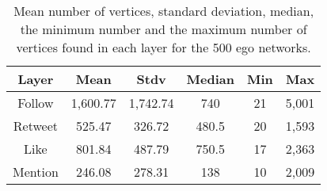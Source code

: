 \begin{table}[h!tb]
    \renewcommand{\arraystretch}{1.3}
    \caption{Mean number of vertices, standard deviation, median, the minimum number and the maximum number of vertices found in each layer for the 500 ego networks.}
    \label{tab:numVertices}
    \centering
    \scriptsize
    \setlength\tabcolsep{6pt} %
    \begin{tabular}{|c|c|c|c|c|c|}
    \hline
        {\bf Layer} &   {\bf Mean}  &   {\bf Stdv}  &   {\bf Median} & {\bf Min}  &   {\bf Max}  \\  \hline \hline
        Follow      &   1,600.77    &   1,742.74    &       740     &       21      &       5,001   \\  \hline
        Retweet    &   525.47      &   326.72      &       480.5   &       20      &       1,593   \\  \hline
        Like       &   801.84      &   487.79      &       750.5   &       17      &       2,363   \\  \hline
        Mention    &   246.08      &   278.31      &       138     &       10      &       2,009   \\  \hline \hline 
    \end{tabular}
\end{table}